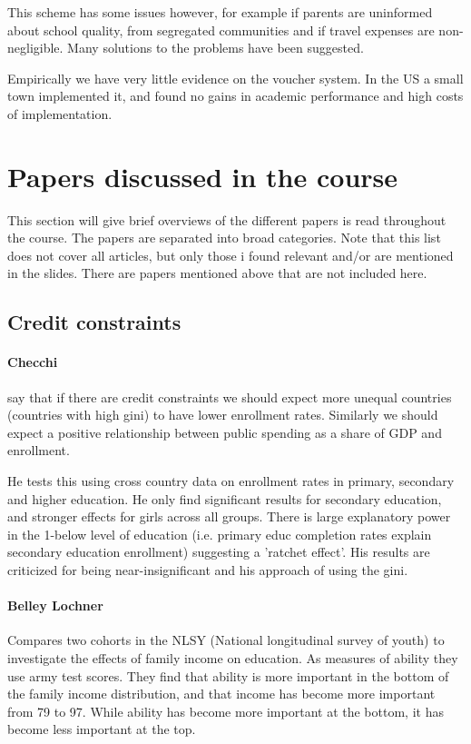 \documentclass[12pt, a4paper]{article}
\begin{document}
\begin{multicols}{2}
This scheme has some issues however, for example if parents are uninformed about school quality, from segregated communities and if travel expenses are non-negligible. Many solutions to the problems have been suggested.

Empirically we have very little evidence on the voucher system. In the US a small town implemented it, and found no gains in academic performance and high costs of implementation. 

\section{Papers discussed in the course}
This section will give brief overviews of the different papers is read throughout the course. The papers are separated into broad categories. Note that this list does not cover all articles, but only those i found relevant and/or are mentioned in the slides. There are papers mentioned above that are not included here.

\subsection{Credit constraints}
\paragraph{Checchi} say that if there are credit constraints we should expect more unequal countries (countries with high gini) to have lower enrollment rates. Similarly we should expect a positive relationship between public spending as  a share of GDP and enrollment. 

He tests this using cross country data on enrollment rates in primary, secondary and higher education. He only find significant results for secondary education, and stronger effects for girls across all groups. There is large explanatory power in the 1-below level of education (i.e. primary educ completion rates explain secondary education enrollment) suggesting a 'ratchet effect'. His results are criticized for being near-insignificant and his approach of using the gini. 


\paragraph{Belley Lochner} Compares two cohorts in the NLSY (National longitudinal survey of youth) to investigate the effects of family income on education. As measures of ability they use army test scores. They find that ability is more important in the bottom of the family income distribution, and that income has become more important from 79 to 97. While ability has become more important at the bottom, it has become less important at the top. 


\end{multicols}
\end{document}
